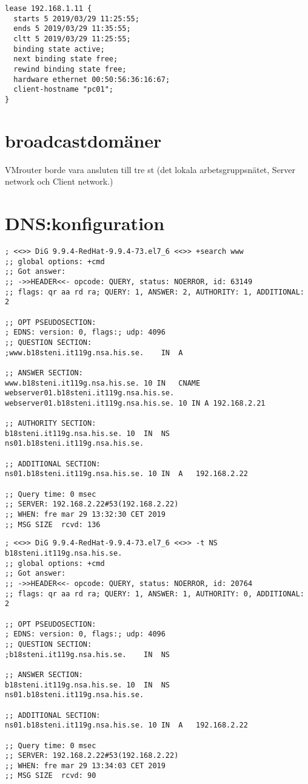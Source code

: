 \documentclass[11pt,a4paper]{article}
\begin{document}
\begin{lstlisting}[caption={/var/lib/dhcp/dhcpd.leases}]
lease 192.168.1.11 {
  starts 5 2019/03/29 11:25:55;
  ends 5 2019/03/29 11:35:55;
  cltt 5 2019/03/29 11:25:55;
  binding state active;
  next binding state free;
  rewind binding state free;
  hardware ethernet 00:50:56:36:16:67;
  client-hostname "pc01";
}
\end{lstlisting}

\section{broadcastdomäner}
\label{sec:broadcastdomains}

VMrouter borde vara ansluten till tre st (det lokala arbetsgruppsnätet, Server network och Client network.)

\section{DNS:konfiguration}
\label{sec:dns_konf}

\begin{lstlisting}[caption={Några frågor, dig +search www}]
; <<>> DiG 9.9.4-RedHat-9.9.4-73.el7_6 <<>> +search www
;; global options: +cmd
;; Got answer:
;; ->>HEADER<<- opcode: QUERY, status: NOERROR, id: 63149
;; flags: qr aa rd ra; QUERY: 1, ANSWER: 2, AUTHORITY: 1, ADDITIONAL: 2

;; OPT PSEUDOSECTION:
; EDNS: version: 0, flags:; udp: 4096
;; QUESTION SECTION:
;www.b18steni.it119g.nsa.his.se.	IN	A

;; ANSWER SECTION:
www.b18steni.it119g.nsa.his.se.	10 IN	CNAME	webserver01.b18steni.it119g.nsa.his.se.
webserver01.b18steni.it119g.nsa.his.se.	10 IN A	192.168.2.21

;; AUTHORITY SECTION:
b18steni.it119g.nsa.his.se. 10	IN	NS	ns01.b18steni.it119g.nsa.his.se.

;; ADDITIONAL SECTION:
ns01.b18steni.it119g.nsa.his.se. 10 IN	A	192.168.2.22

;; Query time: 0 msec
;; SERVER: 192.168.2.22#53(192.168.2.22)
;; WHEN: fre mar 29 13:32:30 CET 2019
;; MSG SIZE  rcvd: 136
\end{lstlisting}

\begin{lstlisting}[caption={Några frågor, dig -t NS b18steni.it119g.nsa.his.se.}]
; <<>> DiG 9.9.4-RedHat-9.9.4-73.el7_6 <<>> -t NS b18steni.it119g.nsa.his.se.
;; global options: +cmd
;; Got answer:
;; ->>HEADER<<- opcode: QUERY, status: NOERROR, id: 20764
;; flags: qr aa rd ra; QUERY: 1, ANSWER: 1, AUTHORITY: 0, ADDITIONAL: 2

;; OPT PSEUDOSECTION:
; EDNS: version: 0, flags:; udp: 4096
;; QUESTION SECTION:
;b18steni.it119g.nsa.his.se.	IN	NS

;; ANSWER SECTION:
b18steni.it119g.nsa.his.se. 10	IN	NS	ns01.b18steni.it119g.nsa.his.se.

;; ADDITIONAL SECTION:
ns01.b18steni.it119g.nsa.his.se. 10 IN	A	192.168.2.22

;; Query time: 0 msec
;; SERVER: 192.168.2.22#53(192.168.2.22)
;; WHEN: fre mar 29 13:34:03 CET 2019
;; MSG SIZE  rcvd: 90
\end{lstlisting}
\end{document}
